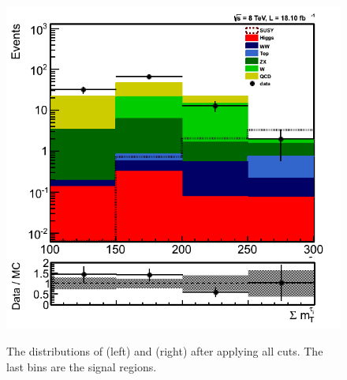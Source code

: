 \begin{figure}[!Hhtb]
\includegraphics[angle=0,scale=0.35]{TauTauFigs/SumMT_SSQCD_dataunblinding.png} \\
\caption{The distributions of \mttwo (left) and \SumMT (right) after applying all cuts. The last bins are the signal regions.}
\label{fig:comparison}
\end{figure}
